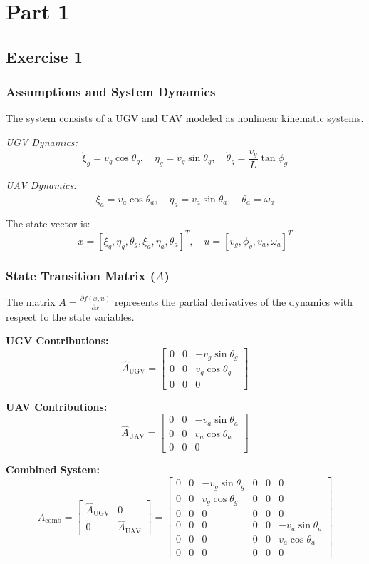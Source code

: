 \newpage
\section*{Part 1}
\subsection*{Exercise 1}

\subsubsection*{Assumptions and System Dynamics}
The system consists of a UGV and UAV modeled as nonlinear kinematic systems.

\noindent\textit{UGV Dynamics:}
\[
\dot{\xi}_g = v_g \cos\theta_g, \quad \dot{\eta}_g = v_g \sin\theta_g, \quad \dot{\theta}_g = \frac{v_g}{L} \tan\phi_g
\]

\noindent\textit{UAV Dynamics:}
\[
\dot{\xi}_a = v_a \cos\theta_a, \quad \dot{\eta}_a = v_a \sin\theta_a, \quad \dot{\theta}_a = \omega_a
\]

\noindent The state vector is:
\[
x = [\xi_g, \eta_g, \theta_g, \xi_a, \eta_a, \theta_a]^T, \quad
u = [v_g, \phi_g, v_a, \omega_a]^T
\]

\subsubsection*{State Transition Matrix (\( A \))}
The matrix \( A = \frac{\partial f(x, u)}{\partial x} \) represents the partial derivatives of the dynamics with respect to the state variables.

\noindent\textbf{UGV Contributions:}
\[
\hat{A}_{\text{UGV}} = 
\begin{bmatrix}
0 & 0 & -v_g \sin\theta_g \\
0 & 0 & v_g \cos\theta_g \\
0 & 0 & 0
\end{bmatrix}
\]

\noindent\textbf{UAV Contributions:}
\[
\hat{A}_{\text{UAV}} = 
\begin{bmatrix}
0 & 0 & -v_a \sin\theta_a \\
0 & 0 & v_a \cos\theta_a \\
0 & 0 & 0
\end{bmatrix}
\]

\noindent\textbf{Combined System:}
\[
A_{\text{comb}} =
\begin{bmatrix}
\hat{A}_{\text{UGV}} & 0 \\
0 & \hat{A}_{\text{UAV}}
\end{bmatrix}
=
\begin{bmatrix}
0 & 0 & -v_g \sin\theta_g & 0 & 0 & 0 \\
0 & 0 & v_g \cos\theta_g & 0 & 0 & 0 \\
0 & 0 & 0 & 0 & 0 & 0 \\
0 & 0 & 0 & 0 & 0 & -v_a \sin\theta_a \\
0 & 0 & 0 & 0 & 0 & v_a \cos\theta_a \\
0 & 0 & 0 & 0 & 0 & 0
\end{bmatrix}
\]

